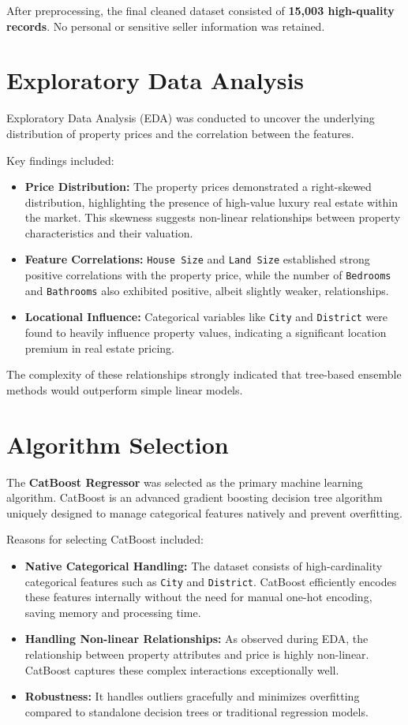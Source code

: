 \documentclass[12pt]{article}
\begin{document}
After preprocessing, the final cleaned dataset consisted of \textbf{15,003 high-quality records}. No personal or sensitive seller information was retained.

\section{Exploratory Data Analysis}
Exploratory Data Analysis (EDA) was conducted to uncover the underlying distribution of property prices and the correlation between the features.

Key findings included:
\begin{itemize}
    \item \textbf{Price Distribution:} The property prices demonstrated a right-skewed distribution, highlighting the presence of high-value luxury real estate within the market. This skewness suggests non-linear relationships between property characteristics and their valuation.
    \item \textbf{Feature Correlations:} \texttt{House Size} and \texttt{Land Size} established strong positive correlations with the property price, while the number of \texttt{Bedrooms} and \texttt{Bathrooms} also exhibited positive, albeit slightly weaker, relationships.
    \item \textbf{Locational Influence:} Categorical variables like \texttt{City} and \texttt{District} were found to heavily influence property values, indicating a significant location premium in real estate pricing.
\end{itemize}

The complexity of these relationships strongly indicated that tree-based ensemble methods would outperform simple linear models.

\section{Algorithm Selection}
The \textbf{CatBoost Regressor} was selected as the primary machine learning algorithm. CatBoost is an advanced gradient boosting decision tree algorithm uniquely designed to manage categorical features natively and prevent overfitting.

Reasons for selecting CatBoost included:
\begin{itemize}
    \item \textbf{Native Categorical Handling:} The dataset consists of high-cardinality categorical features such as \texttt{City} and \texttt{District}. CatBoost efficiently encodes these features internally without the need for manual one-hot encoding, saving memory and processing time.
    \item \textbf{Handling Non-linear Relationships:} As observed during EDA, the relationship between property attributes and price is highly non-linear. CatBoost captures these complex interactions exceptionally well.
    \item \textbf{Robustness:} It handles outliers gracefully and minimizes overfitting compared to standalone decision trees or traditional regression models.
\end{itemize}
\end{document}
